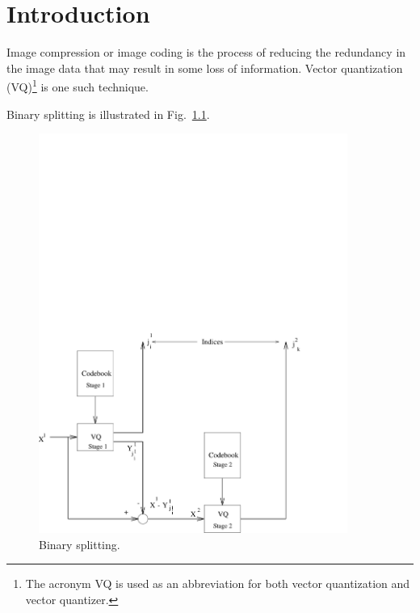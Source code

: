 %
%
%
%

\chapter{Introduction}
Image compression or image coding is the process of reducing the
redundancy in the image data that may result in some loss of
information.  Vector quantization (VQ)\footnote{The acronym VQ is used
  as an abbreviation for both vector quantization and vector
  quantizer.} is one such technique.

Binary splitting is illustrated in Fig.~\ref{fig:split}.

\begin{figure}[htbp]
\centering
\includegraphics[width=0.9\textwidth]{samplefig}
\caption{Binary splitting.}
\label{fig:split}
\end{figure}

